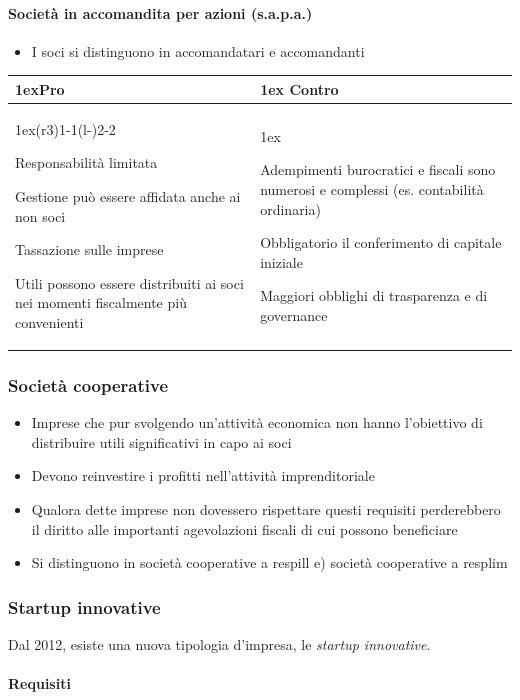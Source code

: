 \documentclass[10pt,a4paper,fleqn,oneside]{book}
\makeatletter
\newcommand{\proandcons}[2]{
    \begin{tabularx}{\linewidth}{>{\parskip1ex}X@{\kern4\tabcolsep}>{\parskip1ex}X}

        \toprule
        \hfil\bfseries Pro
        &
        \hfil\bfseries Contro
        \\\cmidrule(r{3\tabcolsep}){1-1}\cmidrule(l{-\tabcolsep}){2-2}
        
        #1

        &
        #2
        \\\bottomrule
    \end{tabularx}
}
\makeatother
\begin{document}
\paragraph{Società in accomandita per azioni (s.a.p.a.)}
\begin{itemize}
    \item I soci si distinguono in accomandatari e accomandanti
\end{itemize}

\proandcons{
    Responsabilità limitata
    
    Gestione può essere affidata anche ai non soci
    
    Tassazione sulle imprese
    
    Utili possono essere distribuiti ai soci nei momenti fiscalmente più
    convenienti
    
}{
    Adempimenti burocratici e fiscali sono numerosi e complessi (es.
    contabilità ordinaria)
    
    Obbligatorio il conferimento di capitale iniziale

    Maggiori obblighi di trasparenza e di governance
}

\subsubsection{Società cooperative}

\begin{itemize}
    \item Imprese che pur svolgendo un’attività economica non hanno l’obiettivo di
    distribuire utili significativi in capo ai soci
    \item Devono reinvestire i profitti nell’attività imprenditoriale
    \item Qualora dette imprese non dovessero rispettare questi requisiti perderebbero
    il diritto alle importanti agevolazioni fiscali di cui possono beneficiare
    \item Si distinguono in società cooperative a \gls{respill} e) società
    cooperative a \gls{resplim}
\end{itemize}

\subsubsection{Startup innovative}
Dal 2012, esiste una nuova tipologia d'impresa, le \emph{startup innovative}.

\paragraph{Requisiti}
\end{document}
